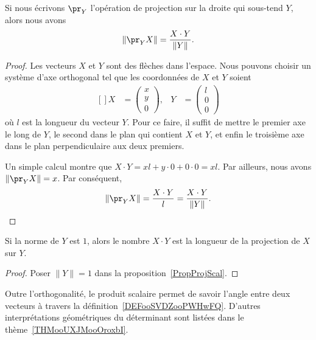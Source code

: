 \begin{proposition}		\label{PropProjScal}
	Si nous écrivons $\pr_Y$  l'opération de projection sur la droite qui sous-tend $Y$, alors nous avons
	\begin{equation}
		\| \pr_YX \|=\frac{ X\cdot Y }{ \| Y \| }.
	\end{equation}
\end{proposition}

\begin{proof}
	Les vecteurs $X$ et $Y$ sont des flèches dans l'espace. Nous pouvons choisir un système d'axe orthogonal tel que les coordonnées de $X$ et $Y$ soient
	\begin{equation}
		\begin{aligned}[]
			X&=\begin{pmatrix}
				x	\\
				y	\\
				0
			\end{pmatrix},
			&Y&=\begin{pmatrix}
				l	\\
				0	\\
				0
			\end{pmatrix}
		\end{aligned}
	\end{equation}
	où $l$ est la longueur du vecteur $Y$. Pour ce faire, il suffit de mettre le premier axe le long de $Y$, le second dans le plan qui contient $X$ et $Y$, et enfin le troisième axe dans le plan perpendiculaire aux deux premiers.

	Un simple calcul montre que $X\cdot Y=xl+y\cdot 0+0\cdot 0=xl$. Par ailleurs, nous avons $\| \pr_YX \|=x$. Par conséquent,
	\begin{equation}
		\| \pr_YX \|=\frac{ X\cdot Y }{ l }=\frac{ X\cdot Y }{ \| Y \| }.
	\end{equation}
\end{proof}

\begin{corollary}
	Si la norme de $Y$ est $1$, alors le nombre $X\cdot Y$ est la longueur de la projection de $X$ sur $Y$.
\end{corollary}

\begin{proof}
	Poser $\| Y \|=1$ dans la proposition~\ref{PropProjScal}.
\end{proof}

\begin{remark}
    Outre l'orthogonalité, le produit scalaire permet de savoir l'angle entre deux vecteurs à travers la définition~\ref{DEFooSVDZooPWHwFQ}. D'autres interprétations géométriques du déterminant sont listées dans le thème~\ref{THMooUXJMooOroxbI}.
\end{remark}

